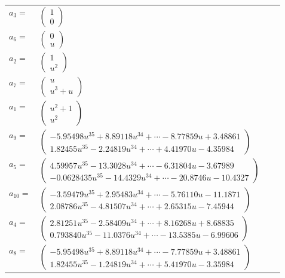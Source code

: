\documentclass[1p]{elsarticle_modified}
\theoremstyle{definition}
\begin{document}
\begin{tabular}{m{7pt} m{180pt} m{7pt} m{180pt} }
\flushright $a_{3}=$&$\begin{pmatrix}1\\0\end{pmatrix}$ \\
\flushright $a_{6}=$&$\begin{pmatrix}0\\u\end{pmatrix}$ \\
\flushright $a_{2}=$&$\begin{pmatrix}1\\u^2\end{pmatrix}$ \\
\flushright $a_{7}=$&$\begin{pmatrix}u\\u^3+u\end{pmatrix}$ \\
\flushright $a_{1}=$&$\begin{pmatrix}u^2+1\\u^2\end{pmatrix}$ \\
\flushright $a_{9}=$&$\begin{pmatrix}-5.95498 u^{35}+8.89118 u^{34}+\cdots-8.77859 u+3.48861\\1.82455 u^{35}-2.24819 u^{34}+\cdots+4.41970 u-4.35984\end{pmatrix}$ \\
\flushright $a_{5}=$&$\begin{pmatrix}4.59957 u^{35}-13.3028 u^{34}+\cdots-6.31804 u-3.67989\\-0.0628435 u^{35}-14.4329 u^{34}+\cdots-20.8746 u-10.4327\end{pmatrix}$ \\
\flushright $a_{10}=$&$\begin{pmatrix}-3.59479 u^{35}+2.95483 u^{34}+\cdots-5.76110 u-11.1871\\2.08786 u^{35}-4.81507 u^{34}+\cdots+2.65315 u-7.45944\end{pmatrix}$ \\
\flushright $a_{4}=$&$\begin{pmatrix}2.81251 u^{35}-2.58409 u^{34}+\cdots+8.16268 u+8.68835\\0.793840 u^{35}-11.0376 u^{34}+\cdots-13.5385 u-6.99606\end{pmatrix}$ \\
\flushright $a_{8}=$&$\begin{pmatrix}-5.95498 u^{35}+8.89118 u^{34}+\cdots-7.77859 u+3.48861\\1.82455 u^{35}-1.24819 u^{34}+\cdots+5.41970 u-3.35984\end{pmatrix}$ \\

\end{tabular}
\end{document}
